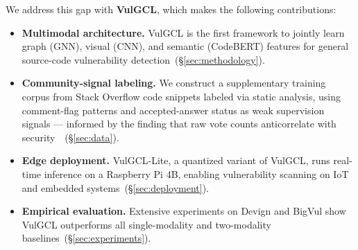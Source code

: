 We address this gap with \textbf{VulGCL}, which makes the following
contributions:

\begin{itemize}
  \item \textbf{Multimodal architecture.} VulGCL is the first framework to
    jointly learn graph (GNN), visual (CNN), and semantic (CodeBERT) features
    for general source-code vulnerability detection~(\S\ref{sec:methodology}).

  \item \textbf{Community-signal labeling.} We construct a supplementary
    training corpus from Stack Overflow code snippets labeled via static
    analysis, using comment-flag patterns and accepted-answer status as weak
    supervision signals — informed by the finding that raw vote counts
    anticorrelate with security~\cite{chen2019reliable}~(\S\ref{sec:data}).

  \item \textbf{Edge deployment.} VulGCL-Lite, a quantized variant of VulGCL,
    runs real-time inference on a Raspberry Pi 4B, enabling vulnerability
    scanning on IoT and embedded systems~(\S\ref{sec:deployment}).

  \item \textbf{Empirical evaluation.} Extensive experiments on Devign and
    BigVul show VulGCL outperforms all single-modality and two-modality
    baselines~(\S\ref{sec:experiments}).
\end{itemize}
